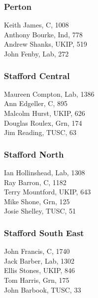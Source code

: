 \documentclass[a4paper,openany,10pt]{book}
\begin{document}
\subsubsection*{Perton}



Keith James, C, 1008\\
Anthony Bourke, Ind, 778\\
Andrew Shanks, UKIP, 519\\
John Fenby, Lab, 272\\


\subsubsection*{Stafford Central}



Maureen Compton, Lab, 1386\\
Ann Edgeller, C, 895\\
Malcolm Hurst, UKIP, 626\\
Douglas Roulex, Grn, 174\\
Jim Reading, TUSC, 63\\


\subsubsection*{Stafford North}



Ian Hollinshead, Lab, 1308\\
Ray Barron, C, 1182\\
Terry Mountford, UKIP, 643\\
Mike Shone, Grn, 125\\
Josie Shelley, TUSC, 51\\


\subsubsection*{Stafford South East}



John Francis, C, 1740\\
Jack Barber, Lab, 1302\\
Ellis Stones, UKIP, 846\\
Tom Harris, Grn, 175\\
John Barbook, TUSC, 33\\
\end{document}
